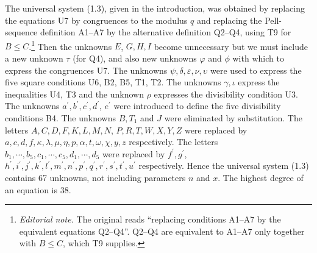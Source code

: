 \documentclass[11pt,a4paper]{article}
\newcommand{\ednote}[1]{\footnote{\textit{Editorial note.} #1}}
\begin{document}
The universal system (1.3), given in the introduction, was obtained by replacing the equations U7 by congruences to the modulus $q$ and replacing the Pell-sequence definition A1--A7 by the alternative definition Q2--Q4, using T9 for $B\leq C$.\ednote{The original reads ``replacing conditions A1--A7 by the equivalent equations Q2--Q4''. Q2--Q4 are equivalent to A1--A7 only together with $B\leq C$, which T9 supplies.} Then the unknowns $E$, $G, H, I$ become unnecessary but we must include a new unknown $\tau$ (for Q4), and also new unknowns $\varphi$ and $\phi$ with which to express the congruences U7. The unknowns $\psi,\delta,\varepsilon,\nu,\upsilon$ were used to express the five square conditions U6, B2, B5, T1, T2. The unknowns $\gamma, \iota$ express the inequalities U4, T3 and the unknown $\rho$ expresses the divisibility condition U3. The unknowns $a^{\prime}, b^{\prime}, c^{\prime}, d^{\prime}$, $e^{\prime}$ were introduced to define the five divisibility conditions B4. The unknowns $B, T_{1}$ and $J$ were eliminated by substitution. The letters $A, C, D, F, K, L, M, N$, $P, R, T, W, X, Y, Z$ were replaced by $a, c, d, f, \kappa, \lambda, \mu, \eta, p, \alpha, t, \omega, \chi, y, z$ respectively. The letters $b_{1}, \cdots, b_{5}, c_{1}, \cdots, c_{5}, d_{1}, \cdots, d_{5}$ were replaced by $f^{\prime}, g^{\prime}$, $h^{\prime}, i^{\prime}, j^{\prime}, k^{\prime}, l^{\prime}, m^{\prime}, n^{\prime}, p^{\prime}, q^{\prime}, r^{\prime}, s^{\prime}, t^{\prime}, u^{\prime}$ respectively. Hence the universal system (1.3) contains 67 unknowns, not including parameters $n$ and $x$. The highest degree of an equation is 38.
\end{document}

